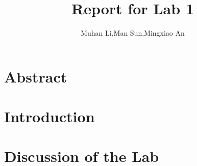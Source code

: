 \documentclass[12pt,letterpaper,onecolumn]{article}
\title{\titlefont Report for Lab 1}
\author{\authorfont Muhan Li,Man Sun,Mingxiao An}
\date{}
\begin{document}
	\maketitle
	\thispagestyle{empty}
	\newpage
	\tableofcontents
	\newpage
	\section{Abstract}	
		
	\section{Introduction}
		
	\section{Discussion of the Lab}
		
\end{document}
